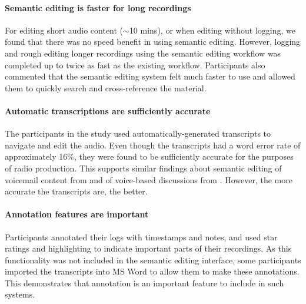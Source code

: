 \paragraph{Semantic editing is faster for long recordings}
For editing short audio content ($\sim$10 mins), or when editing without
logging, we found that there was no speed benefit in using semantic
editing. However, logging and rough editing longer recordings using the
semantic editing workflow was completed up to twice as fast as the existing
workflow. Participants also commented that the semantic editing system felt
much faster to use and allowed them to quickly search and cross-reference the
material.

\paragraph{Automatic transcriptions are sufficiently accurate}
The participants in the study used automatically-generated transcripts to
navigate and edit the audio. Even though the transcripts had a word error rate
of approximately 16\%, they were found to be sufficiently accurate for the
purposes of radio production.  This supports similar findings about semantic
editing of voicemail content from \citet{Whittaker2004} and of voice-based
discussions from \citet{Sivaraman2016}. However, the more accurate
the transcripts are, the better.

\paragraph{Annotation features are important}
Participants annotated their logs with timestamps and notes, and used star
ratings and highlighting to indicate important parts of their recordings. As
this functionality was not included in the semantic editing interface, some
participants imported the transcripts into MS Word to allow them to make these
annotations.  This demonstrates that annotation is an important feature to
include in such systems.


